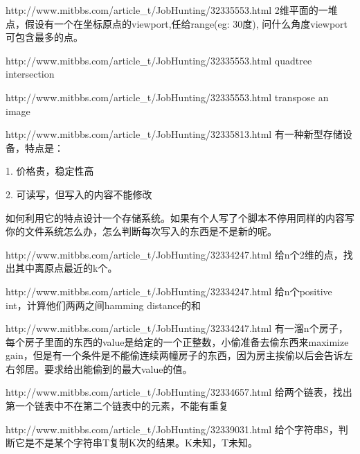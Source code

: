 \documentclass[a4paper]{article}
\begin{document}
\begin{CJK}{UTF8}{gbsn}
\begin{enumerate}
\begin{Q}[Google]{http://www.mitbbs.com/article_t/JobHunting/32335553.html}
2维平面的一堆点，假设有一个在坐标原点的viewport,任给range(eg: 30度), 问什么角度viewport可包含最多的点。
\end{Q}

\begin{Q}[Google]{http://www.mitbbs.com/article_t/JobHunting/32335553.html}
quadtree intersection
\end{Q}

\begin{Q}[Google]{http://www.mitbbs.com/article_t/JobHunting/32335553.html}
transpose an image
\end{Q}

\begin{Q}[Google]{http://www.mitbbs.com/article_t/JobHunting/32335813.html}
有一种新型存储设备，特点是：

1. 价格贵，稳定性高

2. 可读写，但写入的内容不能修改

如何利用它的特点设计一个存储系统。如果有个人写了个脚本不停用同样的内容写你的文件系统怎么办，怎么判断每次写入的东西是不是新的呢。
\end{Q}

\begin{Q}[Facebook]{http://www.mitbbs.com/article_t/JobHunting/32334247.html}
给n个2维的点，找出其中离原点最近的k个。
\end{Q}

\begin{Q}[Facebook]{http://www.mitbbs.com/article_t/JobHunting/32334247.html}
给n个positive int，计算他们两两之间hamming distance的和
\end{Q}

\begin{Q}[Facebook]{http://www.mitbbs.com/article_t/JobHunting/32334247.html}
有一溜n个房子，每个房子里面的东西的value是给定的一个正整数，小偷准备去偷东西来maximize gain，但是有一个条件是不能偷连续两幢房子的东西，因为房主挨偷以后会告诉左右邻居。要求给出能偷到的最大value的值。
\end{Q}

\begin{Q}[Amazon]{http://www.mitbbs.com/article_t/JobHunting/32334657.html}
给两个链表，找出第一个链表中不在第二个链表中的元素，不能有重复
\end{Q}

\begin{Q}[Google]{http://www.mitbbs.com/article_t/JobHunting/32339031.html}
给个字符串S，判断它是不是某个字符串T复制K次的结果。K未知，T未知。
\end{Q}


\end{enumerate}
\end{CJK}
\end{document}
